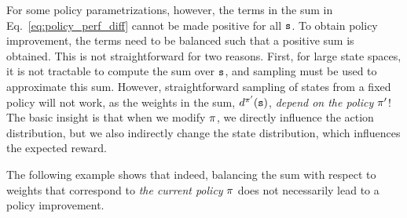 For some policy parametrizations, however, the terms in the sum in Eq.~\ref{eq:policy_perf_diff} cannot be made positive for all ${\tt s}$. To obtain policy improvement, the terms need to be balanced such that a positive sum is obtained. This is not straightforward for two reasons. First, for large state spaces, it is not tractable to compute the sum over ${\tt s}$, and sampling must be used to approximate this sum. However, straightforward sampling of states from a fixed policy will not work, as the weights in the sum, $d^{\pi'}({\tt s})$, \textit{depend on the policy $\pi'$}! 
The basic insight is that when we modify $\pi$, we directly influence the action distribution, but we also indirectly change the state distribution, which influences the expected reward.

The following example shows that indeed, balancing the sum with respect to weights that correspond to \textit{the current policy} $\pi$ does not necessarily lead to a policy improvement. 
